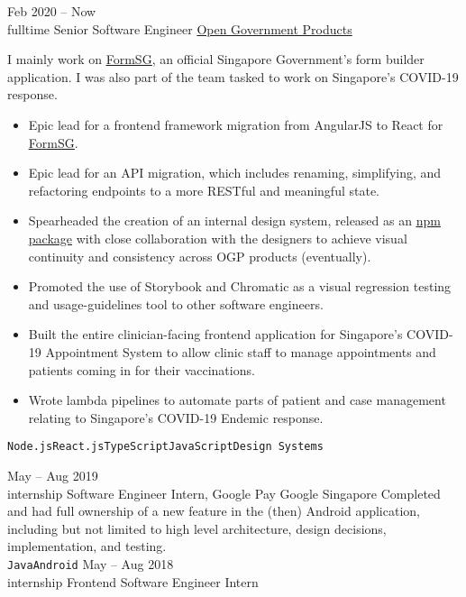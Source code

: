 \documentclass[9pt]{developercv} %
\begin{document}
\begin{entrylist}
	\entry
		{Feb 2020 -- Now\\\footnotesize{fulltime}}
		{Senior Software Engineer}
		{\href{https://open.gov.sg}{Open Government Products}}
		{
      I mainly work on \underline{\href{https://form.gov.sg}{FormSG}}, an official Singapore Government's form builder application. I was also part of the team tasked to work on Singapore's COVID-19 response.
			\begin{itemize}[noitemsep, leftmargin=1.25em]
				\item Epic lead for a frontend framework migration from AngularJS to React for \underline{\href{https://github.com/opengovsg/formsg}{FormSG}}. 
        \item Epic lead for an API migration, which includes renaming, simplifying, and refactoring endpoints to a more RESTful and meaningful state.
        \item Spearheaded the creation of an internal design system, released as an \underline{\href{https://www.npmjs.com/package/@opengovsg/design-system-react}{npm package}} with close collaboration with the designers to achieve visual continuity and consistency across OGP products (eventually).
        \item Promoted the use of Storybook and Chromatic as a visual regression testing and usage-guidelines tool to other software engineers.
        \item Built the entire clinician-facing frontend application for Singapore's COVID-19 Appointment System to allow clinic staff to manage appointments and patients coming in for their vaccinations.
        \item Wrote lambda pipelines to automate parts of patient and case management relating to Singapore's COVID-19 Endemic response.
			\end{itemize}
		\texttt{Node.js}\slashsep\texttt{React.js}\slashsep\texttt{TypeScript}\slashsep\texttt{JavaScript}\slashsep\texttt{Design Systems}}
	\entry
		{May -- Aug 2019\\\footnotesize{internship}}
		{Software Engineer Intern, Google Pay}
		{Google Singapore}
		{Completed and had full ownership of a new feature in the (then) Android application, including but not limited to high level architecture, design decisions, implementation, and testing.
		\\ \texttt{Java}\slashsep\texttt{Android}}
	\entry
		{May -- Aug 2018\\\footnotesize{internship}}
		{Frontend Software Engineer Intern}

\end{entrylist}
\end{document}
